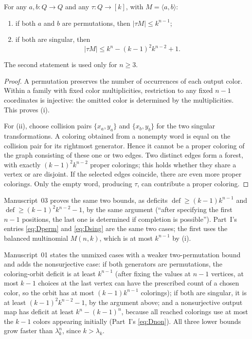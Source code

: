 \documentclass[11pt,a4paper]{article}
\numberwithin{equation}{section}
\theoremstyle{definition}
\theoremstyle{remark}
\newcommand{\defi}{\operatorname{def}}
\begin{document}
\begin{lemma}\label{evo:lem:easy}
For any $a,b:Q\to Q$ and any $\tau:Q\to[k]$, with $M=\langle a,b\rangle$:
\begin{enumerate}[label=(\roman*)]
\item if both $a$ and $b$ are permutations, then $|\tau M|\le k^{n-1}$;
\item if both are singular, then
\[
 |\tau M|\le k^n-(k-1)^2k^{n-2}+1.
\]
\end{enumerate}
The second statement is used only for $n\ge3$.
\end{lemma}
\begin{proof}
A permutation preserves the number of occurrences of each output color.
Within a family with fixed color multiplicities, restriction to any fixed
$n-1$ coordinates is injective: the omitted color is determined by the
multiplicities. This proves (i).

For (ii), choose collision pairs $\{x_a,y_a\}$ and $\{x_b,y_b\}$ for the two
singular transformations. A coloring obtained from a nonempty word is equal
on the collision pair for its rightmost generator. Hence it cannot be a
proper coloring of the graph consisting of these one or two edges. Two
distinct edges form a forest, with exactly $(k-1)^2k^{n-2}$ proper colorings;
this holds whether they share a vertex or are disjoint. If the selected edges
coincide, there are even more proper colorings. Only the empty word, producing
$\tau$, can contribute a proper coloring.
\end{proof}

Manuscript~03 proves the same two bounds, as deficits
$\defi\ge(k-1)k^{n-1}$ and $\defi\ge(k-1)^2k^{n-2}-1$, by the same argument
(``after specifying the first $n-1$ positions, the last one is determined if
completion is possible''). Part~I's entries \eqref{eq:Dperm} and
\eqref{eq:Dsing} are the same two cases; the first uses the balanced
multinomial $M(n,k)$, which is at most $k^{n-1}$ by (i).

\begin{remark}\label{evo:et:rem:unmixed}
Manuscript~01 states the unmixed cases with a weaker two-permutation bound
and adds the nonsurjective case: if both generators are permutations, the
coloring-orbit deficit is at least $k^{n-1}$ (after fixing the values at
$n-1$ vertices, at most $k-1$ choices at the last vertex can have the
prescribed count of a chosen color, so the orbit has at most $(k-1)k^{n-1}$
colorings); if both are singular, it is at least $(k-1)^2k^{n-2}-1$, by the
argument above; and a nonsurjective output map has deficit at least
$k^n-(k-1)^n$, because all reached colorings use at most the $k-1$ colors
appearing initially (Part~I's \eqref{eq:Dnon}). All three lower bounds grow
faster than $\lambda_k^n$, since $k>\lambda_k$.
\end{remark}
\end{document}
